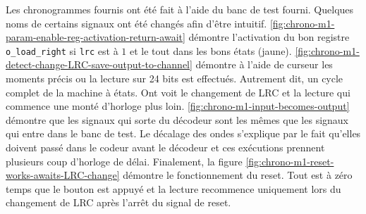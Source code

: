 Les chronogrammes fournis ont été fait à l'aide du banc de test fourni. Quelques noms de certains signaux ont été changés afin d'être intuitif. 
\ref{fig:chrono-m1-param-enable-reg-activation-return-await} démontre l'activation du bon registre \verb|o_load_right| si \verb|lrc| est à $1$ et le tout dans les bons états (jaune). 
\ref{fig:chrono-m1-detect-change-LRC-save-output-to-channel} démontre à l'aide de curseur les moments précis ou la lecture sur 24 bits est effectués. 
Autrement dit, un cycle complet de la machine à états. Ont voit le changement de LRC et la lecture qui commence une monté d'horloge plus loin. 
\ref{fig:chrono-m1-input-becomes-output} démontre que les signaux qui sorte du décodeur sont les mêmes que les signaux qui entre dans le banc de test. 
Le décalage des ondes s'explique par le fait qu'elles doivent passé dans le codeur avant le décodeur et ces exécutions prennent plusieurs coup d'horloge de délai.
Finalement, la figure \ref{fig:chrono-m1-reset-works-awaits-LRC-change} démontre le fonctionnement du reset. Tout est à zéro temps que le bouton est appuyé et 
la lecture recommence uniquement lors du changement de LRC après l'arrêt du signal de reset.

